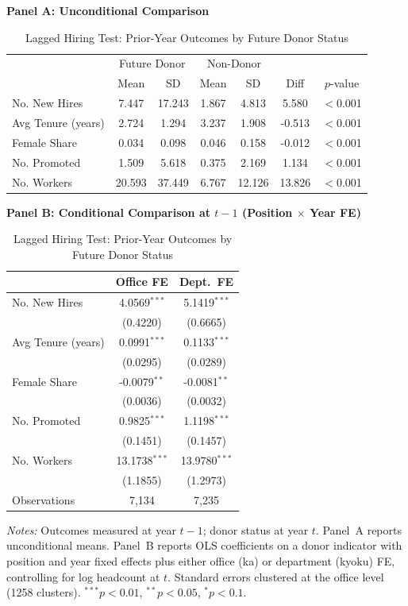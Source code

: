 \begin{table}[htbp]
\centering
\caption{Lagged Hiring Test: Prior-Year Outcomes by Future Donor Status}
\label{tab:donor_lagged}
\small
\begin{threeparttable}

\textbf{Panel A: Unconditional Comparison}
\medskip

\begin{tabular}{lcccccc}
\toprule
 & \multicolumn{2}{c}{Future Donor} & \multicolumn{2}{c}{Non-Donor} & & \\
 & Mean & SD & Mean & SD & Diff & $p$-value \\
\midrule
No. New Hires & 7.447 & 17.243 & 1.867 & 4.813 & 5.580 & $<$0.001 \\
Avg Tenure (years) & 2.724 & 1.294 & 3.237 & 1.908 & -0.513 & $<$0.001 \\
Female Share & 0.034 & 0.098 & 0.046 & 0.158 & -0.012 & $<$0.001 \\
No. Promoted & 1.509 & 5.618 & 0.375 & 2.169 & 1.134 & $<$0.001 \\
No. Workers & 20.593 & 37.449 & 6.767 & 12.126 & 13.826 & $<$0.001 \\
\bottomrule
\end{tabular}

\bigskip

\textbf{Panel B: Conditional Comparison at $t{-}1$ (Position $\times$ Year FE)}
\medskip

\begin{tabular}{lcc}
\toprule
 & Office FE & Dept.\ FE \\
\midrule
No. New Hires & 4.0569$^{***}$ & 5.1419$^{***}$ \\
 & (0.4220) & (0.6665) \\
Avg Tenure (years) & 0.0991$^{***}$ & 0.1133$^{***}$ \\
 & (0.0295) & (0.0289) \\
Female Share & -0.0079$^{**}$ & -0.0081$^{**}$ \\
 & (0.0036) & (0.0032) \\
No. Promoted & 0.9825$^{***}$ & 1.1198$^{***}$ \\
 & (0.1451) & (0.1457) \\
No. Workers & 13.1738$^{***}$ & 13.9780$^{***}$ \\
 & (1.1855) & (1.2973) \\
\midrule
Observations & 7,134 & 7,235 \\
\bottomrule
\end{tabular}

\begin{tablenotes}[flushleft]
\footnotesize
\item \textit{Notes:} Outcomes measured at year $t{-}1$; donor status at year $t$. Panel~A reports unconditional means. Panel~B reports OLS coefficients on a donor indicator with position and year fixed effects plus either office (ka) or department (kyoku) FE, controlling for log headcount at $t$. Standard errors clustered at the office level (1258 clusters). $^{***}p<0.01$, $^{**}p<0.05$, $^{*}p<0.1$.
\end{tablenotes}
\end{threeparttable}
\end{table}
